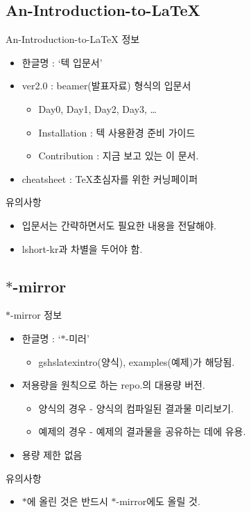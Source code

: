 \documentclass[12pt]{beamer}
\begin{document}
\subsection{An-Introduction-to-LaTeX}
\begin{frame}{An-Introduction-to-LaTeX}
	정보
	\begin{itemize}
		\item 한글명 : `텍 입문서'
		\item ver2.0 : beamer(발표자료) 형식의 입문서
		\begin{itemize}
			\item Day0, Day1, Day2, Day3, \ldots
			\item Installation : 텍 사용환경 준비 가이드
			\item Contribution : 지금 보고 있는 이 문서.
		\end{itemize}
		\item cheatsheet : \TeX 초심자를 위한 커닝페이퍼
	\end{itemize}
	\vfill
	유의사항
	\begin{itemize}
		\item 입문서는 간략하면서도 필요한 내용을 전달해야.
		\item lshort-kr과 차별을 두어야 함.
	\end{itemize}
	\vfill
\end{frame}
\subsection{$ \ast $-mirror}
\begin{frame}{$ \ast $-mirror}
	정보
	\begin{itemize}
		\item 한글명 : `$ \ast $-미러'
		\begin{itemize}
			\item gshslatexintro(양식), examples(예제)가 해당됨.
		\end{itemize}
		\item 저용량을 원칙으로 하는 repo.의 대용량 버전.
		\begin{itemize}
			\item 양식의 경우 - 양식의 컴파일된 결과물 미리보기.
			\item 예제의 경우 - 예제의 결과물을 공유하는 데에 유용.
		\end{itemize}
		\item 용량 제한 없음
	\end{itemize}
	\vfill
	유의사항
	\begin{itemize}
		\item $ \ast $에 올린 것은 반드시 $ \ast $-mirror에도 올릴 것.
	\end{itemize}
	\vfill
\end{frame}
\end{document}
